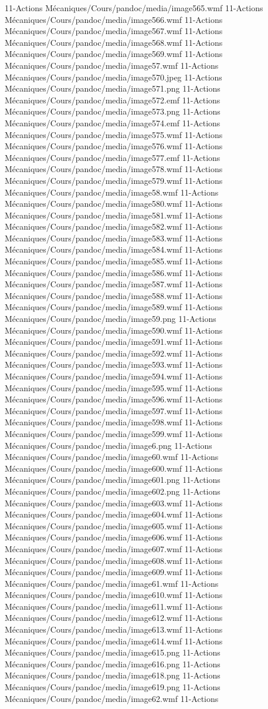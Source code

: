 11-Actions Mécaniques/Cours/pandoc/media/image565.wmf 11-Actions Mécaniques/Cours/pandoc/media/image566.wmf 11-Actions Mécaniques/Cours/pandoc/media/image567.wmf 11-Actions Mécaniques/Cours/pandoc/media/image568.wmf 11-Actions Mécaniques/Cours/pandoc/media/image569.wmf 11-Actions Mécaniques/Cours/pandoc/media/image57.wmf 11-Actions Mécaniques/Cours/pandoc/media/image570.jpeg 11-Actions Mécaniques/Cours/pandoc/media/image571.png 11-Actions Mécaniques/Cours/pandoc/media/image572.emf 11-Actions Mécaniques/Cours/pandoc/media/image573.png 11-Actions Mécaniques/Cours/pandoc/media/image574.emf 11-Actions Mécaniques/Cours/pandoc/media/image575.wmf 11-Actions Mécaniques/Cours/pandoc/media/image576.wmf 11-Actions Mécaniques/Cours/pandoc/media/image577.emf 11-Actions Mécaniques/Cours/pandoc/media/image578.wmf 11-Actions Mécaniques/Cours/pandoc/media/image579.wmf 11-Actions Mécaniques/Cours/pandoc/media/image58.wmf 11-Actions Mécaniques/Cours/pandoc/media/image580.wmf 11-Actions Mécaniques/Cours/pandoc/media/image581.wmf 11-Actions Mécaniques/Cours/pandoc/media/image582.wmf 11-Actions Mécaniques/Cours/pandoc/media/image583.wmf 11-Actions Mécaniques/Cours/pandoc/media/image584.wmf 11-Actions Mécaniques/Cours/pandoc/media/image585.wmf 11-Actions Mécaniques/Cours/pandoc/media/image586.wmf 11-Actions Mécaniques/Cours/pandoc/media/image587.wmf 11-Actions Mécaniques/Cours/pandoc/media/image588.wmf 11-Actions Mécaniques/Cours/pandoc/media/image589.wmf 11-Actions Mécaniques/Cours/pandoc/media/image59.png 11-Actions Mécaniques/Cours/pandoc/media/image590.wmf 11-Actions Mécaniques/Cours/pandoc/media/image591.wmf 11-Actions Mécaniques/Cours/pandoc/media/image592.wmf 11-Actions Mécaniques/Cours/pandoc/media/image593.wmf 11-Actions Mécaniques/Cours/pandoc/media/image594.wmf 11-Actions Mécaniques/Cours/pandoc/media/image595.wmf 11-Actions Mécaniques/Cours/pandoc/media/image596.wmf 11-Actions Mécaniques/Cours/pandoc/media/image597.wmf 11-Actions Mécaniques/Cours/pandoc/media/image598.wmf 11-Actions Mécaniques/Cours/pandoc/media/image599.wmf 11-Actions Mécaniques/Cours/pandoc/media/image6.png 11-Actions Mécaniques/Cours/pandoc/media/image60.wmf 11-Actions Mécaniques/Cours/pandoc/media/image600.wmf 11-Actions Mécaniques/Cours/pandoc/media/image601.png 11-Actions Mécaniques/Cours/pandoc/media/image602.png 11-Actions Mécaniques/Cours/pandoc/media/image603.wmf 11-Actions Mécaniques/Cours/pandoc/media/image604.wmf 11-Actions Mécaniques/Cours/pandoc/media/image605.wmf 11-Actions Mécaniques/Cours/pandoc/media/image606.wmf 11-Actions Mécaniques/Cours/pandoc/media/image607.wmf 11-Actions Mécaniques/Cours/pandoc/media/image608.wmf 11-Actions Mécaniques/Cours/pandoc/media/image609.wmf 11-Actions Mécaniques/Cours/pandoc/media/image61.wmf 11-Actions Mécaniques/Cours/pandoc/media/image610.wmf 11-Actions Mécaniques/Cours/pandoc/media/image611.wmf 11-Actions Mécaniques/Cours/pandoc/media/image612.wmf 11-Actions Mécaniques/Cours/pandoc/media/image613.wmf 11-Actions Mécaniques/Cours/pandoc/media/image614.wmf 11-Actions Mécaniques/Cours/pandoc/media/image615.png 11-Actions Mécaniques/Cours/pandoc/media/image616.png 11-Actions Mécaniques/Cours/pandoc/media/image618.png 11-Actions Mécaniques/Cours/pandoc/media/image619.png 11-Actions Mécaniques/Cours/pandoc/media/image62.wmf 11-Actions 